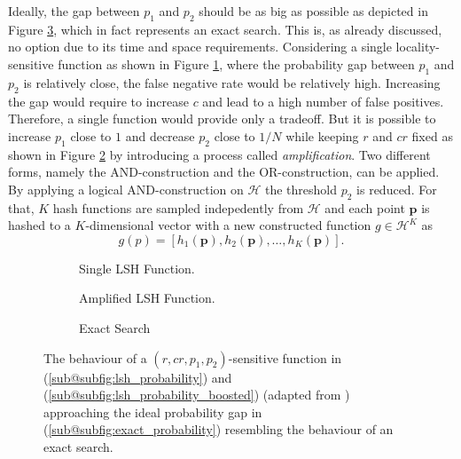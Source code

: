 \documentclass[../../../main.tex]{subfiles}
\begin{document}
Ideally, the gap between $p_1$ and $p_2$ should be as big as possible as depicted in Figure \ref{subfig:exact_probability}, which in fact represents an exact search. This is, as already discussed, no option due to its time and space requirements. Considering a single locality-sensitive function as shown in Figure \ref{subfig:lsh_probability}, where the probability gap between $p_1$ and $p_2$ is relatively close, the false negative rate would be relatively high. Increasing the gap would require to increase $c$ and lead to a high number of false positives. Therefore, a single function would provide only a tradeoff. But it is possible to increase $p_1$ close to $1$ and decrease $p_2$ close to $1/N$ while keeping $r$ and $cr$ fixed as shown in Figure \ref{subfig:lsh_probability_boosted} by introducing a process called \textit{amplification}. Two different forms, namely the AND-construction and the OR-construction, can be applied. By applying a logical AND-construction on $\mathcal{H}$ the threshold $p_2$ is reduced. For that, $K$ hash functions are sampled indepedently from $\mathcal{H}$ and each point $\bm{p}$ is hashed to a $K$-dimensional vector with a new constructed function $g \in \mathcal{H}^K$ as
\begin{equation}\label{eq:or_construction}
    g(p) = [h_1(\bm{p}), h_2(\bm{p}), \dots, h_K(\bm{p})].
\end{equation}

\begin{figure}
    \centering
    \begin{subfigure}[b]{0.3\textwidth}
        \centering
        
        \caption{Single LSH Function.}
        \label{subfig:lsh_probability}
    \end{subfigure}
    \hfill
    \begin{subfigure}[b]{0.3\textwidth}
        \centering
        
        \caption{Amplified LSH Function.}
        \label{subfig:lsh_probability_boosted}
        \end{subfigure}
        \hfill
        \begin{subfigure}[b]{0.3\textwidth}
            \centering
            
            \caption{Exact Search}
            \label{subfig:exact_probability}
    \end{subfigure}
    \caption{The behaviour of a $(r, cr, p_1, p_2)$-sensitive function in (\ref{sub@subfig:lsh_probability}) and (\ref{sub@subfig:lsh_probability_boosted}) (adapted from \cite[100]{leskovec_rajaraman_ullman_2014}) approaching the ideal probability gap in (\ref{sub@subfig:exact_probability}) resembling the behaviour of an exact search.}
    \label{fig:lsh_probability}
\end{figure}
   
\end{document}

